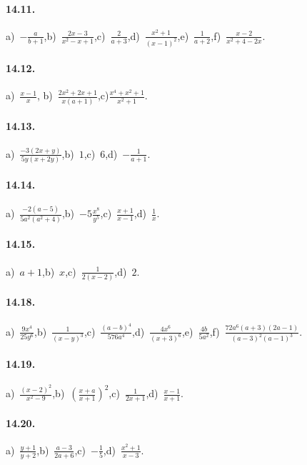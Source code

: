 \paragraph{14.11.}
a)~$-\frac{a}{b+1}$,\quad b)~$\frac{2x-3}{x^2-x+1}$,\quad c)~$\frac{2}{a+3}$,\quad d)~$\frac{x^{2}+1}{(x-1)^2}$,\quad e)~$\frac{1}{a+2}$,\quad f)~$\frac{x-2}{x^2+4-2x}$.

\paragraph{14.12.}
a)~$\frac{x-1}{x}$, %
\quad b)~$\frac{2x^2+2x+1}{x(a+1)}$,\quad c)$\frac{x^{4}+x^{2}+1}{x^2+1}$.

\paragraph{14.13.}
a)~$\frac{-{3(2x+y)}}{5y(x+2y)}$,\quad b)~$1$,\quad c)~$6$,\quad d)~$-{\frac{1}{a+1}}$.

\paragraph{14.14.}
a)~$\frac{-{2(a-5)}}{5a^{2}(a^{2}+4)}$,\quad b)~$-5\frac{x^{8}}{y^{5}}$,\quad c)~$\frac{x+1}{x-1}$,\quad d)~$\frac{1}{x}$.

\paragraph{14.15.}
a)~$a+1$,\quad b)~$x$,\quad c)~$\frac{1}{2(x-2)}$,\quad d)~$2$.

\paragraph{14.18.}
a)~$\frac{9x^{4}}{25y^{6}}$,\quad b)~$\frac{1}{(x-y)^{3}}$,\quad c)~$\frac{(a-b)^{4}}{576a^{4}}$,\quad d)~$\frac{4x^{6}}{(x+3)^{6}}$,\quad e)~$\frac{4b}{5a^{2}}$,\quad f)~$\frac{72a^{6}(a+3)(2a-1)}{(a-3)^{2}(a-1)^{3}}$.

\paragraph{14.19.}
a)~$\frac{(x-2)^{2}}{x^{2}-9}$,\quad b)~$\left(\frac{x+a}{x+1}\right)^{2}$,\quad c)~$\frac{1}{2x+1}$,\quad d)~$\frac{x-1}{x+1}$.

\paragraph{14.20.}
a)~$\frac{y+1}{y+2}$,\quad b)~$\frac{a-3}{2a+6}$,\quad c)~$-{\frac{1}{5}}$,\quad d)~$\frac{x^{2}+1}{x-3}$.

